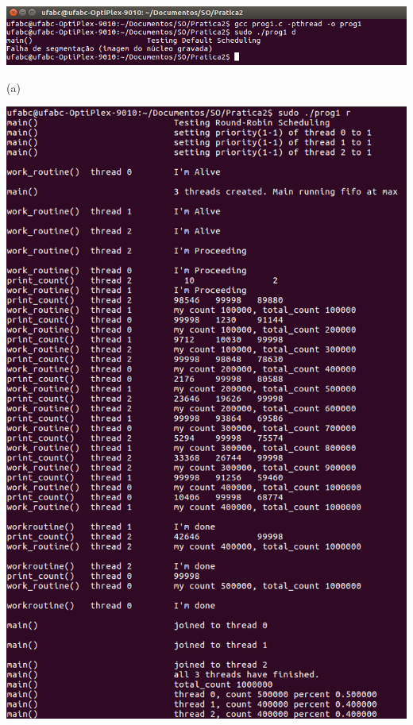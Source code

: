 \vspace{2em}
\begin{minipage}{\textwidth}
    \hspace{-1em}
    \centering
    \begin{minipage}[b]{0.32\textwidth}
        \centering
        \includegraphics[trim=0 0 85 0,clip,scale=.25]{pratica2/prog1-d.png}
        
        (a)
    \end{minipage}
    \hfill
    \begin{minipage}[b]{0.32\textwidth}
        \centering
        \includegraphics[trim=0 0 0 0,clip,scale=.25]{pratica2/prog1-r.png}
        

\end{minipage}
\end{minipage}
